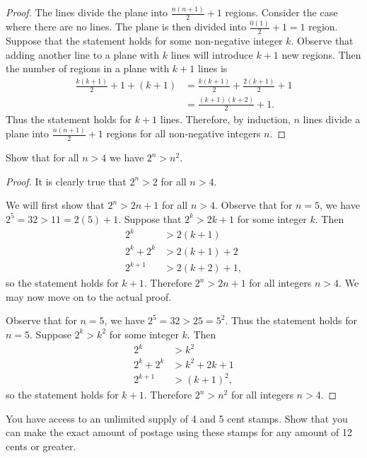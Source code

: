 \documentclass[class=article, crop=false]{standalone}
\begin{document}
  \begin{proof}
    The lines divide the plane into $\frac{n(n+1)}{2}+1$ regions. Consider the case where there are no lines. The plane is then divided into $\frac{0(1)}{2}+1 = 1$ region. \\
    Suppose that the statement holds for some non-negative integer $k$. Observe that adding another line to a plane with $k$ lines will introduce $k+1$ new regions. Then the number of regions in a plane with $k + 1$ lines is
    \begin{align*}
      \frac{k(k+1)}{2}+1  + (k+1) &= \frac{k(k+1)}{2} + \frac{2(k+1)}{2} + 1 \\
      &= \frac{(k+1)(k+2)}{2} + 1.
    \end{align*}
    Thus the statement holds for $k + 1$ lines. Therefore, by induction, $n$ lines divide a plane into $\frac{n(n+1)}{2}+1$ regions for all non-negative integers $n$.
  \end{proof}
  \newpage
  \begin{problem}{4}
    Show that for all $n > 4$ we have $2^n > n^2$.
  \end{problem}
  \begin{proof}
    It is clearly true that $2^n > 2$ for all $n > 4$. \par
    We will first show that $2^n > 2n+1$ for all $n > 4$. Observe that for $n = 5$, we have $2^5 = 32 > 11 = 2(5) + 1$. Suppose that $2^k > 2k+1$ for some integer $k$. Then
    \begin{align*}
      2^k &> 2(k + 1) \\
      2^k + 2^k &> 2(k + 1) + 2 \tag{$2^k > 2$ when $k > 4$} \\
      2^{k + 1} &> 2(k + 2) + 1,
    \end{align*}
    so the statement holds for $k + 1$. Therefore $2^n > 2n + 1$ for all integers $n > 4$. We may now move on to the actual proof. \par
    Observe that for $n = 5$, we have $2^5 = 32 > 25 = 5^2$. Thus the statement holds for $n = 5$. Suppose $2^k > k^2$ for some integer $k$. Then
    \begin{align*}
      2^k &> k^2 \\
      2^k + 2^k &> k^2 + 2k + 1 \tag{$2^k > 2k + 1$ when $k > 4$} \\
      2^{k + 1} &> (k + 1)^2,
    \end{align*}
    so the statement holds for $k + 1$. Therefore $2^n > n^2$ for all integers $n > 4$.
  \end{proof}
  \begin{problem}{5}
    You have access to an unlimited supply of 4 and 5 cent stamps. Show that you can make the exact amount of postage using these stamps for any amount of 12 cents or greater.
  \end{problem}
\end{document}
